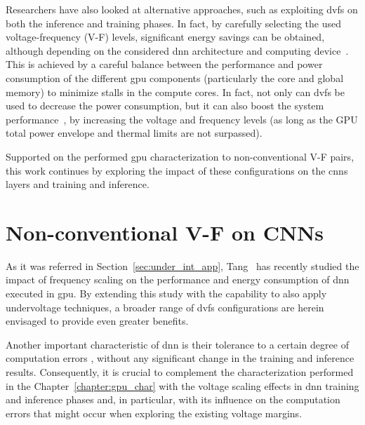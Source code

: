 Researchers have also looked at alternative approaches, such as exploiting \acrshort{dvfs} on both the inference and training phases. In fact, by carefully selecting the used voltage-frequency (V-F) levels, significant energy savings can be obtained, although depending on the considered \acrshort{dnn} architecture and computing  device~\cite{tang_impact_2019}. This is achieved by a careful balance between the performance and power consumption of the different \acrshort{gpu} components  (particularly the core and global memory) to minimize stalls in the compute cores. In fact, not only can \acrshort{dvfs} be used to decrease the power consumption, but it can also boost the system performance~\cite{tang_impact_2019}, by increasing the voltage and frequency levels (as long as the GPU total power envelope and thermal limits are not surpassed).



Supported on the performed \acrshort{gpu} characterization to non-conventional V-F pairs, this work continues by exploring the impact of these configurations on the \acrshort{cnn}s layers and training and inference.

\section{Non-conventional V-F on CNNs}
\label{section:baseline}

As it was referred in Section~\ref{sec:under_int_app}, Tang~\cite{tang_impact_2019} has recently studied the impact of frequency scaling on the performance and energy consumption of \acrshort{dnn} executed in \acrshort{gpu}. By extending this study with the capability to also apply undervoltage techniques, a broader range of \acrshort{dvfs} configurations are herein envisaged to provide even greater benefits. 

Another important characteristic of \acrshort{dnn} is their tolerance to a certain degree of computation errors \cite{zhang_approxann_2015}, without any significant change in the training and inference results. Consequently, it is crucial to complement the characterization performed in the Chapter~\ref{chapter:gpu_char} with the voltage scaling effects in \acrshort{dnn} training and inference phases and, in particular, with its influence on the computation errors that might occur when exploring the existing voltage margins.

